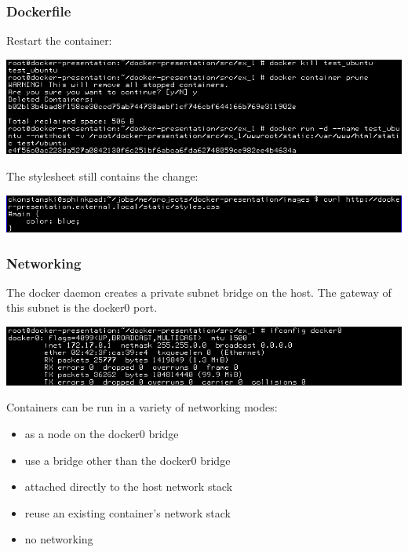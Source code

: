 \documentclass[helvetica,english,utf8,notitle,nologo]{beamer}
\begin{document}
\begin{frame}
  \frametitle{Dockerfile}

  Restart the container:

  \includegraphics[scale=0.44]{image_22}

  The stylesheet still contains the change:

  \includegraphics[scale=0.44]{image_23}
\end{frame}

\begin{frame}
  \frametitle{Networking}

  The docker daemon creates a private subnet bridge on the host. The
  gateway of this subnet is the docker0 port.

  \includegraphics[scale=0.44]{image_24}

  Containers can be run in a variety of networking modes:

  \begin{itemize}
  \item as a node on the docker0 bridge
  \item use a bridge other than the docker0 bridge
  \item attached directly to the host network stack
  \item reuse an existing container's network stack
  \item no networking
  \end{itemize}
\end{frame}
\end{document}
